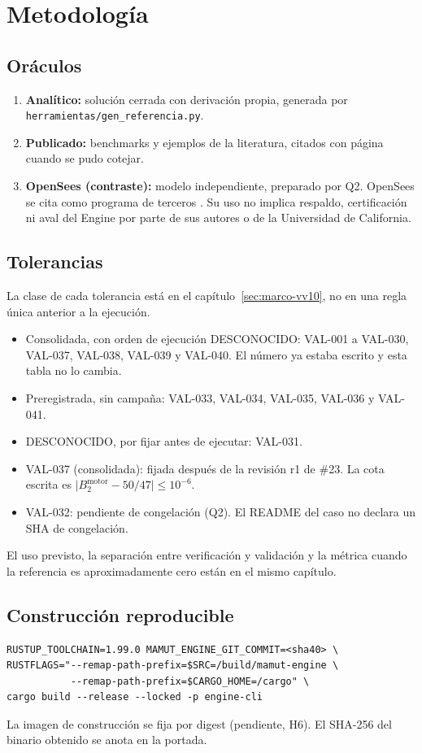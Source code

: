 \chapter{Metodología}
\section{Oráculos}
\begin{enumerate}
\item \textbf{Analítico:} solución cerrada con derivación propia, generada por\\ \texttt{herramientas/gen\_referencia.py}.
\item \textbf{Publicado:} benchmarks y ejemplos de la literatura, citados con página cuando se pudo cotejar.
\item \textbf{OpenSees (contraste):} modelo independiente, preparado por Q2. OpenSees se cita como programa de terceros \cite{opensees}. Su uso no implica respaldo, certificación ni aval del Engine por parte de sus autores o de la Universidad de California.
\end{enumerate}
\section{Tolerancias}
La clase de cada tolerancia está en el capítulo~\ref{sec:marco-vv10}, no en una regla única anterior a la ejecución.
\begin{itemize}
\item Consolidada, con orden de ejecución DESCONOCIDO: VAL-001 a VAL-030, VAL-037, VAL-038, VAL-039 y VAL-040. El número ya estaba escrito y esta tabla no lo cambia.
\item Preregistrada, sin campaña: VAL-033, VAL-034, VAL-035, VAL-036 y VAL-041.
\item DESCONOCIDO, por fijar antes de ejecutar: VAL-031.
\item VAL-037 (consolidada): fijada después de la revisión r1 de \#23. La cota escrita es $\lvert B_2^{\mathrm{motor}}-50/47\rvert\le 10^{-6}$.
\item VAL-032: pendiente de congelación (Q2). El README del caso no declara un SHA de congelación.
\end{itemize}
El uso previsto, la separación entre verificación y validación y la métrica cuando la referencia es aproximadamente cero están en el mismo capítulo.
\section{Construcción reproducible}\label{sec:build}
\begin{verbatim}
RUSTUP_TOOLCHAIN=1.99.0 MAMUT_ENGINE_GIT_COMMIT=<sha40> \
RUSTFLAGS="--remap-path-prefix=$SRC=/build/mamut-engine \
           --remap-path-prefix=$CARGO_HOME=/cargo" \
cargo build --release --locked -p engine-cli
\end{verbatim}
La imagen de construcción se fija por digest (pendiente, H6). El SHA-256 del binario obtenido se anota en la portada.
